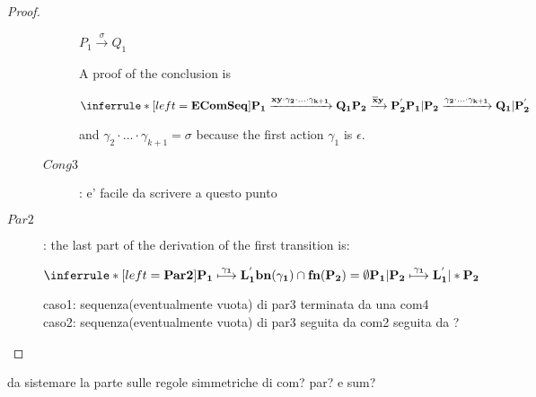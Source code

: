 \begin{proposition}
\begin{proof}
\begin{description}
\begin{description}
		    \begin{center}
		      $P_{1} \xrightarrow{\sigma} Q_{1}$ 
		    \end{center}
		    A proof of the conclusion is
		    \begin{center}
		      $\inferrule* [left=\bf{EComSeq}]{
			  P_{1} \xrightarrow{xy \cdot \gamma_{2}\cdot \ldots \cdot \gamma_{k+1}} Q_{1}
			\\
			  P_{2}\xrightarrow{\overline{x}y} P_{2}^{'}
		      }{
			P_{1}|P_{2} \xrightarrow{\gamma_{2}\cdot \ldots \cdot \gamma_{k+1}} Q_{1}|P_{2}^{'}
		      }$ 
		    \end{center}
		    and $\gamma_{2}\cdot \ldots \cdot \gamma_{k+1}=\sigma$ because the first action $\gamma_{1}$ is $\epsilon$.
		  \item[$Cong3$]: e' facile da scrivere a questo punto
		    
		\end{description}
	      \item[$Par2$]: 
		the last part of the derivation of the first transition is:
		\begin{center}
		  $\inferrule* [left=\bf{Par2}]{
		      P_{1} \stackrel{\gamma_{1}}{\longmapsto} L_{1}^{'}
		    \\
		      bn(\gamma_{1})\cap fn(P_{2})=\emptyset
		  }{
		    P_{1}|P_{2} \stackrel{\gamma_{1}}{\longmapsto} L_{1}^{'}|*P_{2}
		  }$ 		      
		\end{center}
		caso1: sequenza(eventualmente vuota) di par3 terminata da una com4
		caso2: sequenza(eventualmente vuota) di par3 seguita da com2 seguita da ?
	    \end{description}	    
  \end{proof}
\end{proposition}


da sistemare la parte sulle regole simmetriche di com? par? e sum?



